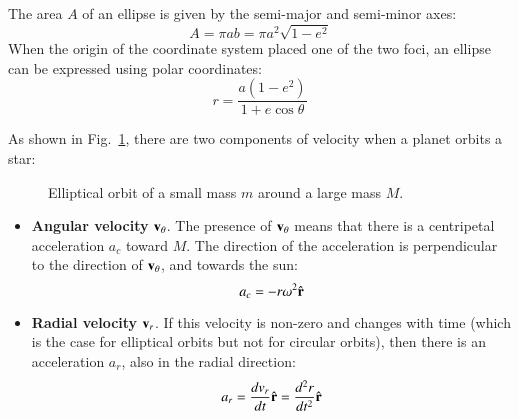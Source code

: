 \documentclass{../../../oss-handout}
\newcommand{\mb}[1]{\ensuremath\mathbf{#1}}
\begin{document}
The area $A$ of an ellipse is given by the semi-major and semi-minor axes:
\begin{equation}
  A=\pi ab=\pi a^2\sqrt{1-e^2}
  \label{A2}
\end{equation}
When the origin of the coordinate system placed one of the two foci, an ellipse
can be expressed using polar coordinates:
\begin{equation}
  r=\frac{a(1-e^2)}{1+e\cos\theta}
  \label{ellipse-eq}
\end{equation}

As shown in Fig.~\ref{eorbit}, there are two components of velocity when a
planet orbits a star:
\begin{figure}[!ht]
  \centering
  \caption{Elliptical orbit of a small mass $m$ around a large mass $M$.}
  \label{eorbit}
\end{figure}
\begin{itemize}[leftmargin=15pt]
\item\textbf{Angular velocity} $\mb{v}_\theta$. The presence of $\mb{v}_\theta$
  means that there is a centripetal acceleration $a_c$ toward $M$. The
  direction of the acceleration is perpendicular to the direction of
  $\mb{v}_\theta$, and towards the sun:
  \begin{equation}
    a_c=-r\omega^2\hat{\mb{r}}
  \end{equation}
\item\textbf{Radial velocity} $\mb{v}_r$. If this velocity is non-zero and
  changes with time (which is the case for elliptical orbits but not for
  circular orbits), then there is an acceleration $a_r$, also in the radial
  direction:
  \begin{equation}
    a_r=\frac{dv_r}{dt}\hat{\mb{r}}=\frac{d^2r}{dt^2}\hat{\mb{r}}
  \end{equation}
\end{itemize}
\end{document}
